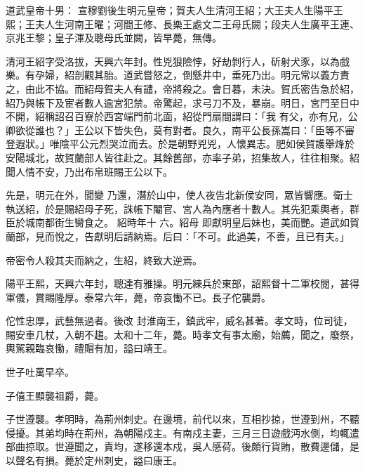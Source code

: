 
\begin{pinyinscope}

 道武皇帝十男：
 宣穆劉後生明元皇帝；賀夫人生清河王紹；大王夫人生陽平王熙；王夫人生河南王曜；河間王修、長樂王處文二王母氏闕；段夫人生廣平王連、京兆王黎；皇子渾及聰母氏並闕，皆早薨，無傳。



 清河王紹字受洛拔，天興六年封。性兇狠險悖，好劫剝行人，斫射犬豕，以為戲樂。有孕婦，紹剖觀其胎。道武嘗怒之，倒懸井中，垂死乃出。明元常以義方責之，由此不協。而紹母賀夫人有譴，帝將殺之。會日暮，未決。賀氏密告急於紹，紹乃與帳下及宦者數人逾宮犯禁。帝驚起，求弓刀不及，暴崩。明日，宮門至日中不開，紹稱詔召百寮於西宮端門前北面，紹從門扇間謂曰：「我
 有父，亦有兄，公卿欲從誰也？」王公以下皆失色，莫有對者。良久，南平公長孫嵩曰：「臣等不審登遐狀。」唯陰平公元烈哭泣而去。於是朝野兇兇，人懷異志。肥如侯賀護舉烽於安陽城北，故賀蘭部人皆往赴之。其餘舊部，亦率子弟，招集故人，往往相聚。紹聞人情不安，乃出布帛班賜王公以下。



 先是，明元在外，聞變
 乃還，潛於山中，使人夜告北新侯安同，眾皆響應。衛士執送紹，於是賜紹母子死，誅帳下閹官、宮人為內應者十數人。其先犯乘輿者，群臣於城南都街生臠食之。
 紹時年十
 六。紹母
 即獻明皇后妹也，美而艷。道武如賀蘭部，見而悅之，告獻明后請納焉。后曰：「不可。此過美，不善，且已有夫。」



 帝密令人殺其夫而納之，生紹，終致大逆焉。



 陽平王熙，天興六年封，聰達有雅操。明元練兵於東部，詔熙督十二軍校閱，甚得軍儀，賞賜隆厚。泰常六年，薨，帝哀慟不已。長子佗襲爵。



 佗性忠厚，武藝無過者。後改
 封淮南王，鎮武牢，威名甚著。孝文時，位司徒，賜安車几杖，入朝不趨。太和十二年，薨。時孝文有事太廟，始薦，聞之，廢祭，輿駕親臨哀慟，禮賵有加，謚曰靖王。



 世子吐萬早卒。



 子僖王顯襲祖爵，薨。



 子世遵襲。孝明時，為荊州刺史。在邊境，前代以來，互相抄掠，世遵到州，不聽侵擾。其弟均時在荊州，為朝陽戍主。有南戍主妻，三月三日遊戲沔水側，均輒遣部曲掠取。世遵聞之，責均，遂移還本戍，吳人感荷。後頗行貨賄，散費邊儲，是以聲名有損。薨於定州刺史，謚曰康王。




\end{pinyinscope}

